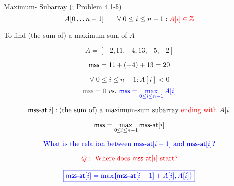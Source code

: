 
\begin{frame}{}
  \begin{exampleblock}{Maximum- Subarray (\mss; Problem 4.1-5)}
    \[
      A[0 \ldots n-1] \qquad \forall\; 0 \le i \le n-1: \textcolor{red}{A[i] \in \mathbb{Z}}
    \]

    \begin{center}
      To find (the sum of) a maximum-sum  of $A$
    \end{center}
  \end{exampleblock}

  \pause
  \[
    A = [-2, 11, -4, 13, -5, -2]
  \]

  \vspace{-0.30cm}
  \[
    \textsf{mss} = 11 + (-4) + 13 = 20
  \]
  


  \pause
  \[
    \forall\; 0 \le i \le n - 1: A[i] < 0 
  \]
  \[
    \textcolor{gray}{\mss = 0} \;\text{\it vs. } \blue{\mss = \max\limits_{0 \le i \le n-1} A[i]}
  \]
\end{frame}

% 
% 
%   

\begin{frame}{}
  \[
    \textsf{mss-at}[i]: \text{(the sum of) a maximum-sum subarray \textcolor{red}{ending with }} A[i]
  \]

  \pause
  \vspace{-0.30cm}
  \[
    \textsf{mss} = \max_{0 \le i \le n-1} \textsf{mss-at}[i]
  \]

  \pause
  \[
    \textcolor{blue}{\text{What is the relation between } \textsf{mss-at}[i-1] \text{ and } \textsf{mss-at}[i]?}
  \]

  \pause
  \[
    \textcolor{red}{Q: \text{ Where does } \textsf{mss-at}[i] \text{ start}?}
  \]

  \pause

  \pause
  \[
    \textcolor{blue}{\boxed{\textsf{mss-at}[i] = \max \{\textsf{mss-at}[i-1] + A[i], A[i]\}}}
  \]


\end{frame}

